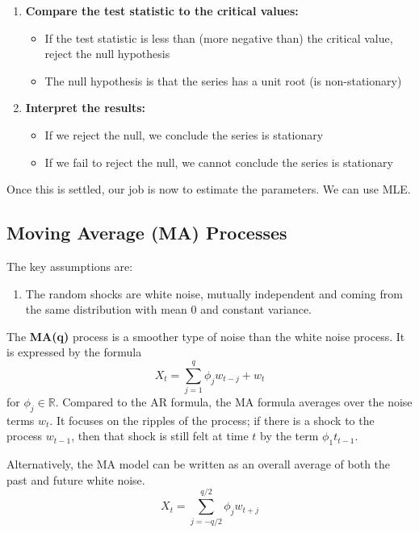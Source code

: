 \documentclass{article}
\begin{document}
\begin{definition}
\begin{enumerate}
      \item \textbf{Compare the test statistic to the critical values:}
      \begin{itemize}
          \item If the test statistic is less than (more negative than) the critical value, reject the null hypothesis
          \item The null hypothesis is that the series has a unit root (is non-stationary)
      \end{itemize}

      \item \textbf{Interpret the results:}
      \begin{itemize}
          \item If we reject the null, we conclude the series is stationary
          \item If we fail to reject the null, we cannot conclude the series is stationary
      \end{itemize}
    \end{enumerate} 
  \end{definition}

  Once this is settled, our job is now to estimate the parameters. We can use MLE. 
  
\subsection{Moving Average (MA) Processes}

  The key assumptions are: 
  \begin{enumerate}
    \item The random shocks are white noise, mutually independent and coming from the same distribution with mean $0$ and constant variance. 
  \end{enumerate}

  \begin{definition}
    The \textbf{MA(q)} process is a smoother type of noise than the white noise process. It is expressed by the formula 
    \begin{equation}
      X_t = \sum_{j=1}^q \phi_j w_{t-j} + w_t
    \end{equation}
    for $\phi_j \in \mathbb{R}$. Compared to the AR formula, the MA formula averages over the noise terms $w_t$. It focuses on the ripples of the process; if there is a shock to the process $w_{t-1}$, then that shock is still felt at time $t$ by the term $\phi_1 t_{t-1}$. 

    Alternatively, the MA model can be written as an overall average of both the past and future white noise. 
    \begin{equation}
      X_t = \sum_{j=-q/2}^{q/2} \phi_j w_{t +j}
    \end{equation}
  \end{definition}
\end{document}
